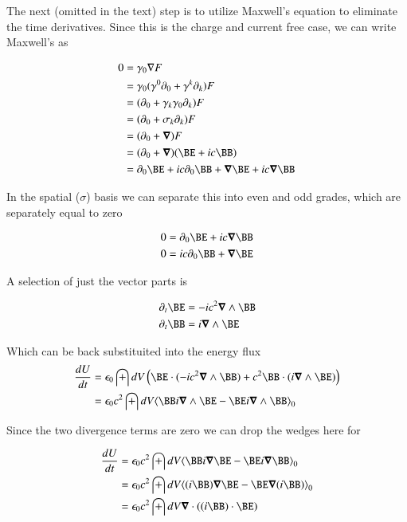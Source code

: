 \documentclass{article}
\begin{document}
The next (omitted in the text) step is to utilize Maxwell's equation to eliminate the time derivatives.  Since this is the
charge and current free case, we can write Maxwell's as

\begin{align*}
0
&= \gamma_0 \grad F \\
&= \gamma_0 (\gamma^0 \partial_0 + \gamma^k \partial_k) F \\
&= (\partial_0 + \gamma_k\gamma_0 \partial_k) F \\
&= (\partial_0 + \sigma_k \partial_k) F \\
&= (\partial_0 + \spacegrad)F \\
&= (\partial_0 + \spacegrad)(\BE + ic \BB) \\
&= \partial_0 \BE + ic \partial_0 \BB + \spacegrad \BE + ic \spacegrad \BB \\
\end{align*}

In the spatial ($\sigma$) basis we can separate this into even and odd grades, which are separately equal to zero

\begin{align*}
0 &= \partial_0 \BE + ic \spacegrad \BB \\
0 &= ic \partial_0 \BB + \spacegrad \BE 
\end{align*}

A selection of just the vector parts is

\begin{align*}
\partial_t \BE &= - ic^2 \spacegrad \wedge \BB \\
\partial_t \BB &= i\spacegrad \wedge \BE 
\end{align*}

Which can be back substituited into the energy flux
\begin{align*}
\frac{dU}{dt} 
&= \epsilon_0 \int dV \left( \BE \cdot (-i c^2 \spacegrad \wedge \BB) + c^2 \BB \cdot (i \spacegrad \wedge \BE) \right) \\
&= \epsilon_0 c^2 \int dV \gpgradezero{ \BB i \spacegrad \wedge \BE -\BE i \spacegrad \wedge \BB } \\
\end{align*}

Since the two divergence terms are zero we can drop the wedges here for

\begin{align*}
\frac{dU}{dt} 
&= \epsilon_0 c^2 \int dV \gpgradezero{ \BB i \spacegrad \BE -\BE i \spacegrad \BB } \\
&= \epsilon_0 c^2 \int dV \gpgradezero{ (i \BB) \spacegrad \BE -\BE \spacegrad (i\BB) } \\
&= \epsilon_0 c^2 \int dV \spacegrad \cdot ( (i \BB) \cdot \BE ) \\
\end{align*}
\end{document}
